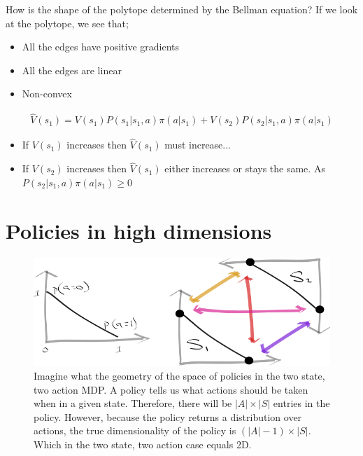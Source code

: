 How is the shape of the polytope determined by the Bellman equation?
If we look at the polytope, we see that;
\begin{itemize}
\tightlist
\item
  All the edges have positive gradients
\item
  All the edges are linear
\item
  Non-convex
\end{itemize}



\begin{align}
\hat V(s_1) = V(s_1)P(s_1|s_1, a)\pi(a|s_1) + V(s_2)P(s_2|s_1, a)\pi(a|s_1)
\end{align}

\begin{itemize}
\tightlist
\item
If $V(s_1)$ increases then $\hat V(s_1)$ must increase...
\item
If $V(s_2)$ increases then $\hat V(s_1)$  either increases or stays the same. As $P(s_2|s_1, a)\pi(a|s_1) \ge 0$
\end{itemize}

\section{Policies in high dimensions}



\begin{figure}
\centering
\includegraphics[width=1\textwidth,height=0.25\textheight]{../../pictures/drawings/2-state-2-action-simplices.png}
\caption{Imagine what the geometry of the space of policies in the two state, two action MDP. A policy tells us what actions should be taken when in a given state. Therefore, there will be \(|A| \times |S|\) entries in the policy. However, because the policy returns a distribution over actions, the true dimensionality of the policy is \((|A| -1) \times |S|\). Which in the two state, two action case equals 2D.}
\end{figure}


